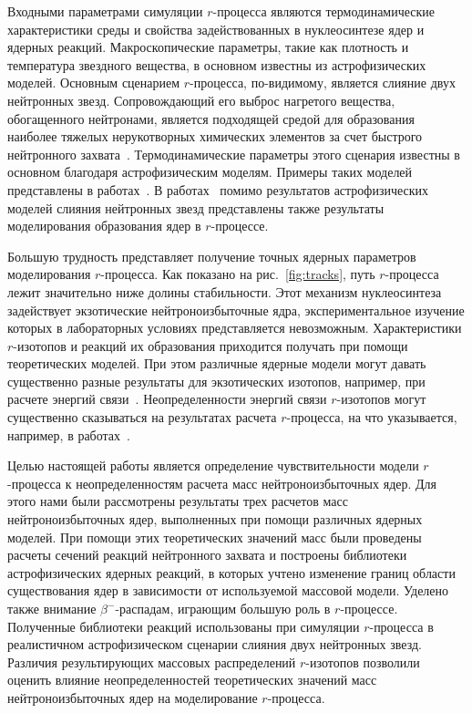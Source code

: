Входными параметрами симуляции $r$-процесса являются термодинамические характеристики среды и свойства задействованных в нуклеосинтезе ядер и ядерных реакций. Макроскопические параметры, такие как плотность и температура звездного вещества, в основном известны из астрофизических моделей. Основным сценарием $r$-процесса, по-видимому, является слияние двух нейтронных звезд. Сопровождающий его выброс нагретого вещества, обогащенного нейтронами, является подходящей средой для образования наиболее тяжелых нерукотворных химических элементов за счет быстрого нейтронного захвата~\cite{theilemann2017}. Термодинамические параметры этого сценария известны в основном благодаря астрофизическим моделям. Примеры таких моделей представлены в работах~\cite{rosswog1999, rosswog2013}. В работах~\cite{korobkin2012, rosswog2014, kullman2021} помимо результатов астрофизических моделей слияния нейтронных звезд представлены также результаты моделирования образования ядер в $r$-процессе.

Большую трудность представляет получение точных ядерных параметров моделирования $r$-процесса. Как показано на рис.~\ref{fig:tracks}, путь $r$-процесса лежит значительно ниже долины стабильности. Этот механизм нуклеосинтеза задействует экзотические нейтроноизбыточные ядра, экспериментальное изучение которых в лабораторных условиях представляется невозможным. Характеристики $r$-изотопов и реакций их образования приходится получать при помощи теоретических моделей. При этом различные ядерные модели могут давать существенно разные результаты для экзотических изотопов, например, при расчете энергий связи~\cite{sobiczewski2018}. Неопределенности энергий связи $r$-изотопов могут существенно сказываться на результатах расчета $r$-процесса, на что указывается, например, в работах~\cite{goriely2001, brett2012}.

Целью настоящей работы является определение чувствительности модели $r$-процесса к неопределенностям расчета масс нейтроноизбыточных ядер. Для этого нами были рассмотрены результаты трех расчетов масс нейтроноизбыточных ядер, выполненных при помощи различных ядерных моделей. При помощи этих теоретических значений масс были проведены расчеты сечений реакций нейтронного захвата и построены библиотеки астрофизических ядерных реакций, в которых учтено изменение границ области существования ядер в зависимости от используемой массовой модели. Уделено также внимание $\beta^-$-распадам, играющим большую роль в $r$-процессе. Полученные библиотеки реакций использованы при симуляции $r$-процесса в реалистичном астрофизическом сценарии слияния двух нейтронных звезд. Различия результирующих массовых распределений $r$-изотопов позволили оценить влияние неопределенностей теоретических значений масс нейтроноизбыточных ядер на моделирование $r$-процесса.
